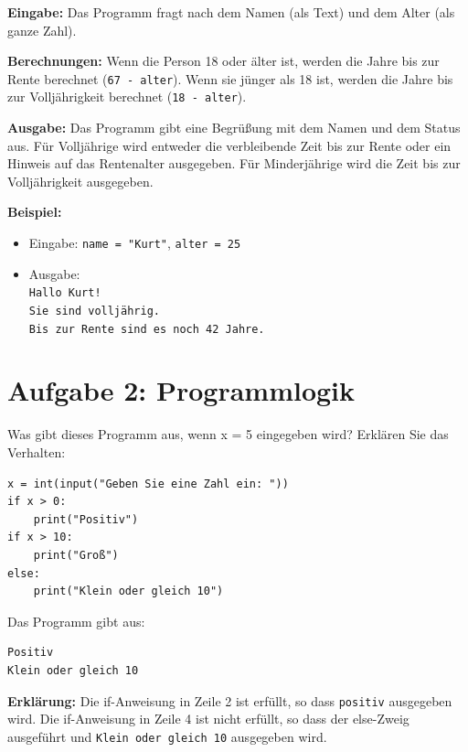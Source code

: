 \documentclass[ngerman,11pt]{article}
\begin{document}
\begin{loesung}
\color{blue}
\textbf{Eingabe:} Das Programm fragt nach dem Namen (als Text) und dem Alter (als ganze Zahl).

\par\medskip

\textbf{Berechnungen:} Wenn die Person 18 oder älter ist, werden die Jahre bis zur Rente berechnet (\texttt{67 - alter}). Wenn sie jünger als 18 ist, werden die Jahre bis zur Volljährigkeit berechnet (\texttt{18 - alter}).

\par\medskip

\textbf{Ausgabe:} Das Programm gibt eine Begrüßung mit dem Namen und dem Status aus. Für Volljährige wird entweder die verbleibende Zeit bis zur Rente oder ein Hinweis auf das Rentenalter ausgegeben. Für Minderjährige wird die Zeit bis zur Volljährigkeit ausgegeben.

\par\medskip

\textbf{Beispiel:}\\[-8mm]
\begin{itemize}[leftmargin=*]
\item Eingabe: \texttt{name = "Kurt"}, \texttt{alter = 25}\\[-7mm]
\item Ausgabe:\\
\texttt{Hallo Kurt!}\\
\texttt{Sie sind volljährig.}\\
\texttt{Bis zur Rente sind es noch 42 Jahre.}
\end{itemize}
\end{loesung}

\section*{Aufgabe 2: Programmlogik}
Was gibt dieses Programm aus, wenn x = 5 eingegeben wird? Erklären Sie das Verhalten:

\begin{lstlisting}
x = int(input("Geben Sie eine Zahl ein: "))
if x > 0:
    print("Positiv")
if x > 10:
    print("Groß")
else:
    print("Klein oder gleich 10")
\end{lstlisting}

\begin{loesung}
\color{blue}
Das Programm gibt aus:
\begin{verbatim}
Positiv
Klein oder gleich 10
\end{verbatim}

\textbf{Erklärung:} Die if-Anweisung in Zeile 2 ist erfüllt, so dass \texttt{positiv} ausgegeben wird. Die if-Anweisung in Zeile 4 ist nicht erfüllt, so dass der else-Zweig ausgeführt und \texttt{Klein oder gleich 10} ausgegeben wird.
\end{loesung}
\end{document}

